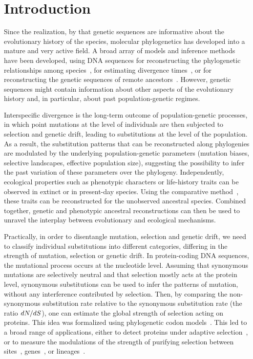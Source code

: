 \section{Introduction}
\label{sec:Introduction}

Since the realization, by \citet{Zuckerkandl1965} that genetic sequences are informative about the evolutionary history of the species, molecular phylogenetics has developed into a mature and very active field.
A broad array of models and inference methods have been developed, using \acrshort{DNA} sequences for reconstructing the phylogenetic relationships among species~\citep{Felsenstein1981}, for estimating divergence times~\citep{Thorne2002}, or for reconstructing the genetic sequences of remote ancestors~\citep{Liberles2007}.
However, genetic sequences might contain information about other aspects of the evolutionary history and, in particular, about past population-genetic regimes.

Interspecific divergence is the long-term outcome of population-genetic processes, in which point mutations at the level of individuals are then subjected to selection and \gls{genetic drift}, leading to \glspl{substitution} at the level of the population.
As a result, the \gls{substitution} patterns that can be reconstructed along phylogenies are modulated by the underlying population-genetic parameters (mutation biases, selective landscapes, effective population size), suggesting the possibility to infer the past variation of these parameters over the phylogeny.
Independently, ecological properties such as phenotypic characters or life-history traits can be observed in extinct or in present-day species.
Using the comparative method~\citep{Felsenstein1985}, these traits can be reconstructed for the unobserved ancestral species.
Combined together, genetic and phenotypic ancestral reconstructions can then be used to unravel the interplay between evolutionary and ecological mechanisms.

Practically, in order to disentangle mutation, selection and \gls{genetic drift}, we need to classify individual \glspl{substitution} into different categories, differing in the strength of mutation, selection or \gls{genetic drift}.
In protein-coding \acrshort{DNA} sequences, the mutational process occurs at the nucleotide level.
Assuming that \gls{synonymous} mutations are selectively \gls{neutral} and that selection mostly acts at the protein level, \gls{synonymous} \glspl{substitution} can be used to infer the patterns of mutation, without any interference contributed by selection.
Then, by comparing the \gls{non-synonymous} \gls{substitution} rate relative to the \gls{synonymous} \gls{substitution} rate (the ratio $dN/dS$), one can estimate the global strength of selection acting on proteins.
This idea was formalized using phylogenetic \gls{codon} models~\citep{Muse1994,Goldman1994}.
This led to a broad range of applications, either to detect proteins under adaptive selection~\citep{Kosiol2008}, or to measure the modulations of the strength of purifying selection between sites~\citep{Echave2016}, genes~\citep{Zhang2015}, or lineages~\citep{Lartillot2011}.

